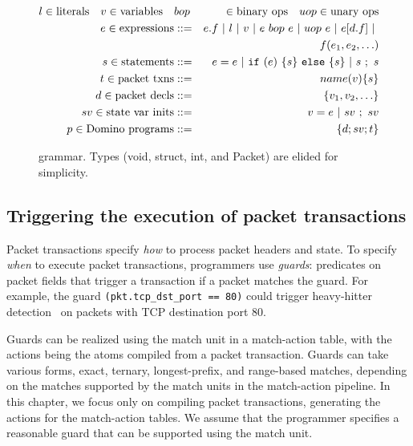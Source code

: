 \begin{figure}[!t]
\newcommand{\sep}{~|~}
\begin{small}
\begin{eqnarray*}
l \in \text{literals} \quad v \in \text{variables} \quad &bop& \in \text{binary ops} \quad
uop \in \text{unary ops} \\
%
e \in \text{expressions} &::=& e.f \sep l \sep v \sep e~bop~e \sep uop~e \sep e[d.f] \sep \\
                   & &   f(e_1, e_2, \ldots) \\
%
s \in \text{statements} &::=& e = e \sep {\tt if}~(e)~\{ s \}~{\tt else}~ \{ s \} \sep s~;~s \\
%
t \in \text{packet txns} &::=& name(v) \{ s \} \\
%
%
d \in \text{packet decls} &::=& \{ v_1, v_2, \ldots \} \\
%
sv \in \text{state var inits} &::=& v = e \sep sv~;~sv \\
%
p \in \text{\pktlanguage programs} &::=& \{ d ; sv; t \}
\end{eqnarray*}
\end{small}
\caption{\pktlanguage grammar. Types (void, struct, int, and Packet) are elided for simplicity.}
\label{fig:grammar}
\end{figure}

\subsection{Triggering the execution of packet transactions}
\label{ss:guards}
Packet transactions specify \textit{how} to process packet headers and state.
To specify {\em when} to execute packet transactions, programmers use {\em
guards}: predicates on packet fields that trigger a transaction if a packet
matches the guard. For example, the guard {\tt (pkt.tcp\_dst\_port == 80)}
could trigger heavy-hitter detection~\cite{opensketch} on packets with TCP
destination port 80.

Guards can be realized using the match unit in a match-action table, with the
actions being the atoms compiled from a packet transaction. Guards can take
various forms, \eg exact, ternary, longest-prefix, and range-based matches,
depending on the matches supported by the match units in the match-action
pipeline. In this chapter, we focus only on compiling packet transactions, \ie
generating the actions for the match-action tables. We assume that the
programmer specifies a reasonable guard that can be supported using the match
unit.

